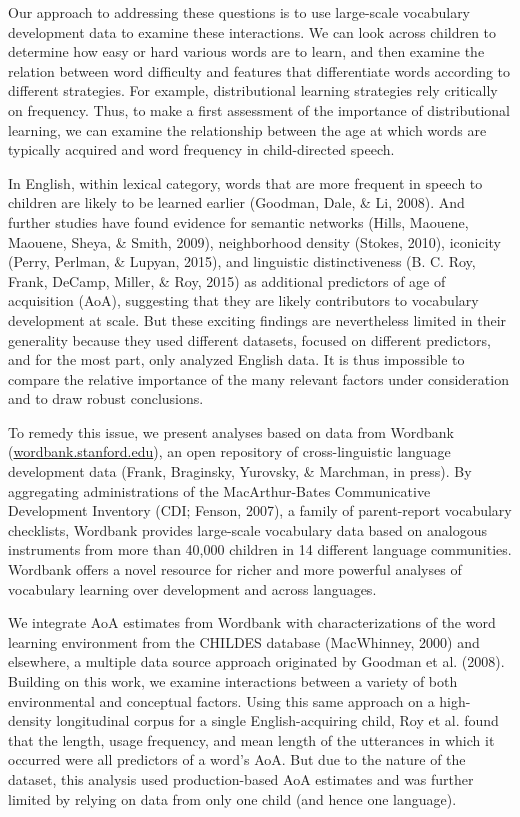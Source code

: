 \documentclass[10pt, letterpaper]{article}
\begin{document}
Our approach to addressing these questions is to use large-scale
vocabulary development data to examine these interactions. We can look
across children to determine how easy or hard various words are to
learn, and then examine the relation between word difficulty and
features that differentiate words according to different strategies. For
example, distributional learning strategies rely critically on
frequency. Thus, to make a first assessment of the importance of
distributional learning, we can examine the relationship between the age
at which words are typically acquired and word frequency in
child-directed speech.

In English, within lexical category, words that are more frequent in
speech to children are likely to be learned earlier (Goodman, Dale, \&
Li, 2008). And further studies have found evidence for semantic networks
(Hills, Maouene, Maouene, Sheya, \& Smith, 2009), neighborhood density
(Stokes, 2010), iconicity (Perry, Perlman, \& Lupyan, 2015), and
linguistic distinctiveness (B. C. Roy, Frank, DeCamp, Miller, \& Roy,
2015) as additional predictors of age of acquisition (AoA), suggesting
that they are likely contributors to vocabulary development at scale.
But these exciting findings are nevertheless limited in their generality
because they used different datasets, focused on different predictors,
and for the most part, only analyzed English data. It is thus impossible
to compare the relative importance of the many relevant factors under
consideration and to draw robust conclusions.

To remedy this issue, we present analyses based on data from Wordbank
(\href{http://wordbank.stanford.edu}{wordbank.stanford.edu}), an open
repository of cross-linguistic language development data (Frank,
Braginsky, Yurovsky, \& Marchman, in press). By aggregating
administrations of the MacArthur-Bates Communicative Development
Inventory (CDI; Fenson, 2007), a family of parent-report vocabulary
checklists, Wordbank provides large-scale vocabulary data based on
analogous instruments from more than 40,000 children in 14 different
language communities. Wordbank offers a novel resource for richer and
more powerful analyses of vocabulary learning over development and
across languages.

We integrate AoA estimates from Wordbank with characterizations of the
word learning environment from the CHILDES database (MacWhinney, 2000)
and elsewhere, a multiple data source approach originated by Goodman et
al. (2008). Building on this work, we examine interactions between a
variety of both environmental and conceptual factors. Using this same
approach on a high-density longitudinal corpus for a single
English-acquiring child, Roy et al. found that the length, usage
frequency, and mean length of the utterances in which it occurred were
all predictors of a word's AoA. But due to the nature of the dataset,
this analysis used production-based AoA estimates and was further
limited by relying on data from only one child (and hence one language).
\end{document}
